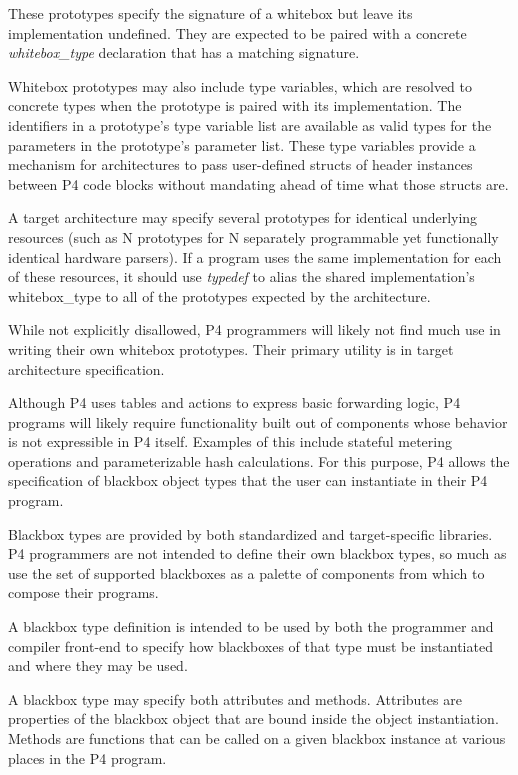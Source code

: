 \documentclass[12pt]{article}
\begin{document}
These prototypes specify the signature of a whitebox but leave its
implementation undefined. They are expected to be paired with a concrete
\textit{whitebox_type} declaration that has a matching signature.

Whitebox prototypes may also include type variables, which are resolved to
concrete types when the prototype is paired with its implementation. The
identifiers in a prototype's type variable list are available as valid types for
the parameters in the prototype's parameter list. These type variables provide a
mechanism for architectures to pass user-defined structs of header instances
between P4 code blocks without mandating ahead of time what those structs are.

A target architecture may specify several prototypes for identical underlying
resources (such as N prototypes for N separately programmable yet functionally
identical hardware parsers). If a program uses the same implementation for each
of these resources, it should use \textit{typedef} to alias the shared
implementation's whitebox_type to all of the prototypes expected by the
architecture.

While not explicitly disallowed, P4 programmers will likely not find much use
in writing their own whitebox prototypes. Their primary utility is in target
architecture specification.


Although P4 uses \matchaction tables and actions to express basic forwarding
logic, P4 programs will likely require functionality built out of components
whose behavior is not expressible in P4 itself. Examples of this include
stateful metering operations and parameterizable hash calculations. For this
purpose, P4 allows the specification of blackbox object types that the
user can instantiate in their P4 program.

Blackbox types are provided by both standardized and target-specific libraries.
P4 programmers are not intended to define their own blackbox types, so much
as use the set of supported blackboxes as a palette of components from which
to compose their programs. 

A blackbox type definition is intended to be used by both the programmer and
compiler front-end to specify how blackboxes of that type must be instantiated
and where they may be used. 

A blackbox type may specify both attributes and methods. Attributes are
properties of the blackbox object that are bound inside the object
instantiation. Methods are functions that can be called on a given blackbox
instance at various places in the P4 program.
\end{document}
